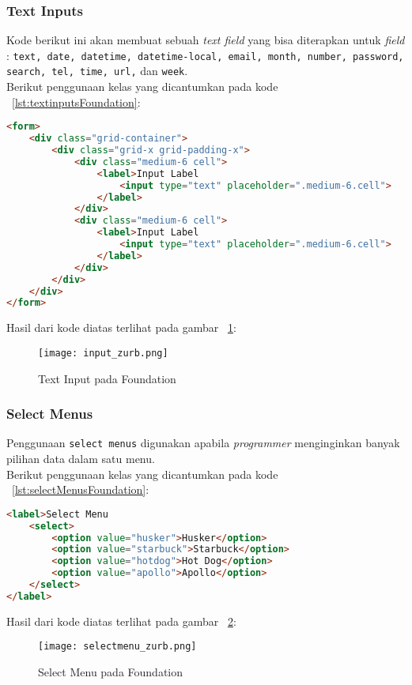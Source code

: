 \subsubsection{Text Inputs}
Kode berikut ini akan membuat sebuah \textit{text field} yang bisa diterapkan untuk \textit{field} : \texttt{text, date, datetime, datetime-local, email, month, number, password, search, tel, time, url,} dan \texttt{week}.\\

\noindent Berikut penggunaan kelas yang dicantumkan pada kode ~\ref{lst:textinputsFoundation}:

\begin{lstlisting}[style=customhtml, language=HTML,  basicstyle=\ttfamily, frame=single, columns=fullflexible, keepspaces=true, breaklines=true, showstringspaces=false, label={lst:textinputsFoundation}, caption=Text inputs pada foundation 6.] 
<form>
	<div class="grid-container">
		<div class="grid-x grid-padding-x">
			<div class="medium-6 cell">
				<label>Input Label
					<input type="text" placeholder=".medium-6.cell">
				</label>
			</div>
			<div class="medium-6 cell">
				<label>Input Label
					<input type="text" placeholder=".medium-6.cell">
				</label>
			</div>
		</div>
	</div>
</form>
\end{lstlisting}
\noindent Hasil dari kode diatas terlihat pada gambar ~\ref{fig:textinputZurb}:
\begin{figure} [H]
	\centering  
	\texttt{[image: input\_zurb.png]}  
	\caption{Text Input pada Foundation}
	\label{fig:textinputZurb} 
\end{figure}

\subsubsection{Select Menus}
Penggunaan \texttt{select menus} digunakan apabila \textit{programmer} menginginkan banyak pilihan data dalam satu menu.\\
\noindent Berikut penggunaan kelas yang dicantumkan pada kode ~\ref{lst:selectMenusFoundation}:
\begin{lstlisting}[style=customhtml, language=HTML,  basicstyle=\ttfamily, frame=single, columns=fullflexible, keepspaces=true, breaklines=true, showstringspaces=false, label={lst:selectMenusFoundation}, caption=Select menus pada foundation 6.] 
<label>Select Menu
	<select>
		<option value="husker">Husker</option>
		<option value="starbuck">Starbuck</option>
		<option value="hotdog">Hot Dog</option>
		<option value="apollo">Apollo</option>
	</select>
</label>
\end{lstlisting}
\noindent Hasil dari kode diatas terlihat pada gambar ~\ref{fig:selectmenuFoundation}:
\begin{figure} [H]
	\centering  
	\texttt{[image: selectmenu\_zurb.png]}  
	\caption{Select Menu pada Foundation}
	\label{fig:selectmenuFoundation}
\end{figure}

